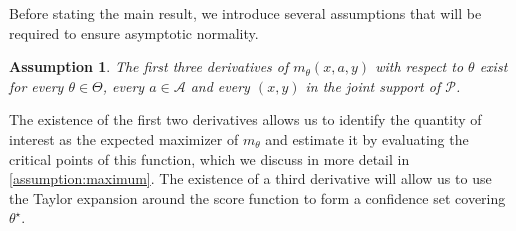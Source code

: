 \documentclass[11pt]{article}
\newcommand{\R}{\mathbb{R}}
\newtheorem{assumption}{Assumption}
\begin{document}
Before stating the main result, we introduce several assumptions that will be required to ensure asymptotic normality. 

\begin{assumption} \label{assumption:differentiability}
The first three derivatives of $m_{\theta}(x,a,y)$ with respect to $\theta$ exist for every $\theta \in \Theta$, every $a \in \mathcal{A}$ and every $(x,y)$ in the joint support of $\mathcal{P}$.
\end{assumption}

The existence of the first two derivatives allows us to identify the quantity of interest as the expected maximizer of $m_{\theta}$ and estimate it by evaluating the critical points of this function, which we discuss in more detail in \cref{assumption:maximum}. The existence of a third derivative will allow us to use the Taylor expansion around the score function to form a confidence set covering $\theta^{\star}$. 
\end{document}
